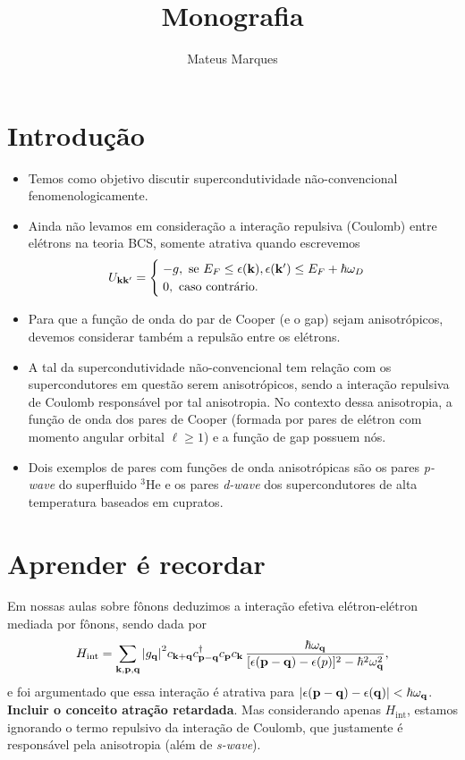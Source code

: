 \documentclass[a4paper,11pt]{article}
\title{\Huge{\textbf{Monografia}}}
\author{Mateus Marques}
\begin{document}
\maketitle

\section{Introdução}

\begin{itemize}
\item Temos como objetivo discutir supercondutividade não-convencional fenomenologicamente.
\item Ainda não levamos em consideração a interação repulsiva (Coulomb) entre elétrons na teoria BCS, somente atrativa quando escrevemos
$$
U_{\vb{k}\vb{k}'} =
\begin{cases}
\; -g, \text{ se } E_F \leq \epsilon(\vb{k}), \epsilon(\vb{k}') \leq E_F + \hbar \omega_D \\
\; 0, \text{ caso contrário.}
\end{cases}
$$
\item Para que a função de onda do par de Cooper (e o gap) sejam anisotrópicos, devemos considerar também a repulsão entre os elétrons.
\item A tal da supercondutividade não-convencional tem relação com os supercondutores em questão serem anisotrópicos, sendo a interação repulsiva de Coulomb responsável por tal anisotropia. No contexto dessa anisotropia, a função de onda dos pares de Cooper (formada por pares de elétron com momento angular orbital $\ell \geq 1$) e a função de gap possuem nós.
\item Dois exemplos de pares com funções de onda anisotrópicas são os pares \textit{p-wave} do superfluido $^3$He e os pares \textit{d-wave} dos supercondutores de alta temperatura baseados em cupratos.
\end{itemize}

\section{Aprender é recordar}

Em nossas aulas sobre fônons deduzimos a interação efetiva elétron-elétron mediada por fônons, sendo dada por
$$
H_{\text{int}} = \sum_{\vb{k},\vb{p},\vb{q}} \abs{g_{\vb{q}}}^2 c_{\vb{k}+\vb{q}} c_{\vb{p}-\vb{q}}^\dagger c_{\vb{p}} c_{\vb{k}} \,
\frac{\hbar \omega_{\vb{q}}}{[\epsilon(\vb{p}-\vb{q}) - \epsilon(p)]^2 - \hbar^2 \omega_{\vb{q}}^2},
$$
e foi argumentado que essa interação é atrativa para $\abs{\epsilon(\vb{p}-\vb{q}) - \epsilon(\vb{q})} < \hbar \omega_{\vb{q}}$. \textbf{Incluir o conceito atração retardada}. Mas considerando apenas $H_{\text{int}}$, estamos ignorando o termo repulsivo da interação de Coulomb, que justamente é responsável pela anisotropia (além de \textit{s-wave}).
\end{document}
